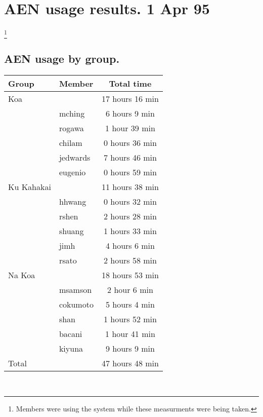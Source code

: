 







\chapter{AEN usage results. 1 Apr 95}
\footnote{Members were using the system
while these measurments were being taken.}
\section{AEN usage by group.}
\begin{tabular}{|l|l|c|}
\hline
Group&Member&Total time\\
\hline
\hline
Koa&&17 hours 16 min\\
\hline
&mching&6 hours 9 min\\
&rogawa&1 hour 39 min\\
&chilam&0 hours 36 min\\
&jedwards&7 hours 46 min\\
&eugenio&0 hours 59 min\\
\hline
\hline
Ku Kahakai&&11 hours 38 min\\
\hline
&hhwang&0 hours 32 min\\
&rshen&2 hours 28 min\\
&shuang&1 hours 33 min\\
&jimh&4 hours 6 min\\
&rsato&2 hours 58 min\\
\hline
\hline
Na Koa&&18 hours 53 min\\
\hline
&msamson&2 hour 6 min\\
&cokumoto&5 hours 4 min\\
&shan&1 hours 52 min\\
&bacani&1 hour 41 min\\
&kiyuna&9 hours 9 min\\
\hline
\hline
Total&&47 hours 48 min\\
\hline
\end{tabular} \\

